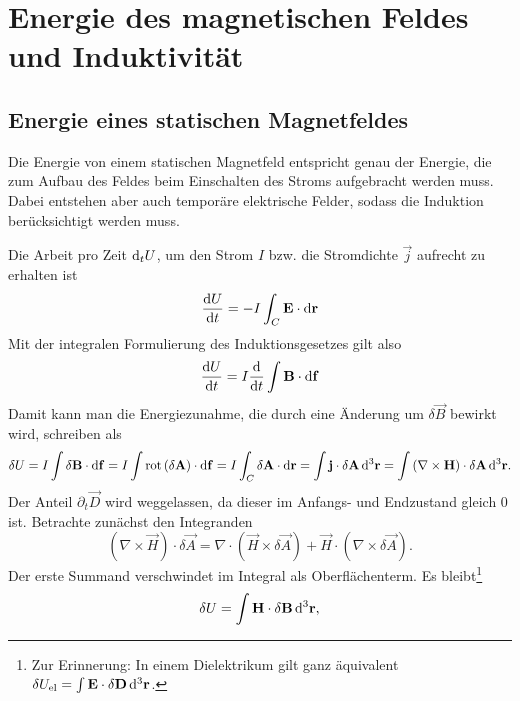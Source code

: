 \section{Energie des magnetischen Feldes und Induktivität}

\subsection{Energie eines statischen Magnetfeldes}

Die Energie von einem statischen Magnetfeld entspricht genau der Energie, die zum Aufbau des Feldes beim Einschalten des Stroms aufgebracht werden muss. Dabei entstehen aber auch temporäre elektrische Felder, sodass die Induktion berücksichtigt werden muss.

Die Arbeit pro Zeit $\mathop{}\!\mathrm{d} _{t}U$, um den Strom $I$ bzw. die Stromdichte $\vec {j}$ aufrecht zu erhalten ist
\begin{equation*}
	\frac{\mathop{}\!\mathrm{d} U}{\mathop{}\!\mathrm{d} t}=-I\int _{C}\mathbf{E}\cdot \mathop{}\!\mathrm{d} \mathbf{r}
\end{equation*}
Mit der integralen Formulierung des Induktionsgesetzes gilt also
\begin{equation*}
	\frac{\mathop{}\!\mathrm{d} U}{\mathop{}\!\mathrm{d} t}=I\frac{\mathop{}\!\mathrm{d} }{\mathop{}\!\mathrm{d} t}\int \mathbf{B}\cdot \mathop{}\!\mathrm{d} \mathbf{f}
\end{equation*}
Damit kann man die Energiezunahme, die durch eine Änderung um $\delta \vec {B}$ bewirkt wird, schreiben als
\begin{equation*}
	\delta U=I\int \delta \mathbf{B}\cdot \mathop{}\!\mathrm{d} \mathbf{f}=I\int \operatorname{rot} \left(\delta \mathbf{A}\right)\cdot \mathop{}\!\mathrm{d} \mathbf{f}=I\int _{C}\delta \mathbf{A}\cdot \mathop{}\!\mathrm{d} \mathbf{r}=\int \mathbf{j}\cdot \delta \mathbf{A}\mathop{}\!\mathrm{d} ^{3}\mathbf{r}=\int \left(\nabla \times \mathbf{H}\right)\cdot \delta \mathbf{A}\mathop{}\!\mathrm{d} ^{3}\mathbf{r}.
\end{equation*}
Der Anteil $\partial _{t}\vec {D}$ wird weggelassen, da dieser im Anfangs- und Endzustand gleich $0$ ist. Betrachte zunächst den Integranden
\begin{equation*}
	\left(\nabla \times \vec {H}\right)\cdot \delta \vec {A}=\nabla \cdot \left(\vec {H}\times \delta \vec {A}\right)+\vec {H}\cdot \left(\nabla \times \delta \vec {A}\right).
\end{equation*}
Der erste Summand verschwindet im Integral als Oberflächenterm. Es bleibt\footnote{Zur Erinnerung: In einem Dielektrikum gilt ganz äquivalent $\delta U_{\mathrm{el}}=\int \mathbf{E}\cdot \delta \mathbf{D}\mathop{}\!\mathrm{d} ^{3}\mathbf{r}$. }
\begin{equation*}
	\delta U=\int \mathbf{H}\cdot \delta \mathbf{B}\mathop{}\!\mathrm{d} ^{3}\mathbf{r},
\end{equation*}
